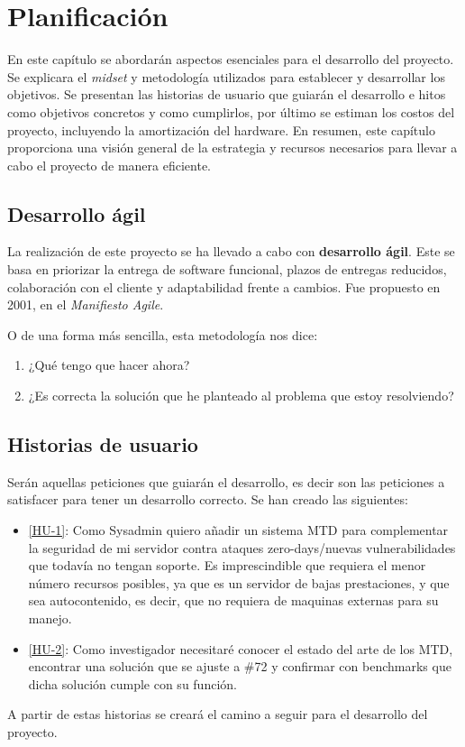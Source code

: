 \chapter{Planificación}
En este capítulo se abordarán aspectos esenciales para el desarrollo del proyecto. Se explicara el \textit{midset} y metodología utilizados para establecer y desarrollar los objetivos. Se presentan las historias de usuario que guiarán el desarrollo e hitos como objetivos concretos y como cumplirlos, por último se estiman los costos del proyecto, incluyendo la amortización del hardware. En resumen, este capítulo proporciona una visión general de la estrategia y recursos necesarios para llevar a cabo el proyecto de manera eficiente.

\section{Desarrollo ágil}
La realización de este proyecto se ha llevado a cabo con \textbf{desarrollo ágil}. Este se basa en priorizar la entrega de software funcional, plazos de entregas reducidos, colaboración con el cliente y adaptabilidad frente a cambios. Fue propuesto en 2001, en el \textit{Manifiesto Agile}.\cite{agile}

O de una forma más sencilla, esta metodología nos dice:
\begin{enumerate}
    \item ¿Qué tengo que hacer ahora?
    \item ¿Es correcta la solución que he planteado al problema que estoy resolviendo?
\end{enumerate}

\section{Historias de usuario}
Serán aquellas peticiones que guiarán el desarrollo, es decir son las peticiones a satisfacer para tener un desarrollo correcto. Se han creado las siguientes:
\begin{itemize}
    \item \href{https://github.com/marcosrmartin/MTD_Server/issues/72}{[HU-1]}:  
    Como Sysadmin quiero añadir un sistema MTD para complementar la seguridad de mi servidor contra ataques zero-days/nuevas vulnerabilidades que todavía no tengan soporte. Es imprescindible que requiera el menor número recursos posibles, ya que es un servidor de bajas prestaciones, y que sea autocontenido, es decir, que no requiera de maquinas externas para su manejo.    
    \item \href{https://github.com/marcosrmartin/MTD_Server/issues/73}{[HU-2]}: Como investigador necesitaré conocer el estado del arte de los MTD, encontrar una solución que se ajuste a \#72 y confirmar con benchmarks que dicha solución cumple con su función.
\end{itemize}
A partir de estas historias se creará el camino a seguir para el desarrollo del proyecto.

